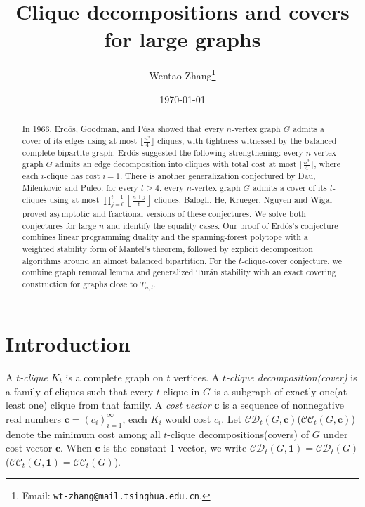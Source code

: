 \documentclass[11pt]{article}
\title{Clique decompositions and covers for large graphs}
\author{Wentao Zhang\thanks{Email: {\tt wt-zhang@mail.tsinghua.edu.cn}.}}
\affil{Yau Mathematical Sciences Center, Tsinghua University, Beijing, 100084, China}
\date{\today}
\numberwithin{equation}{section}
\theoremstyle{remark}
\newcommand{\CC}{\mathcal{CC}}
\newcommand{\CD}{\mathcal{CD}}
\begin{document}
\maketitle

\begin{abstract}
In 1966, Erd\H{o}s, Goodman, and P{\'o}sa showed that every \(n\)-vertex graph \(G\) admits a cover of its edges using at most \(\lfloor \frac{n^2}{4}\rfloor\) cliques, with tightness witnessed by the balanced complete bipartite graph.
Erd\H{o}s suggested the following strengthening: every \(n\)-vertex graph \(G\) admits an edge decomposition into cliques with total cost at most \(\lfloor \frac{n^2}{4}\rfloor\), where each \(i\)-clique has cost \(i-1\).
There is another generalization conjectured by Dau, Milenkovic and Puleo: for every \(t\ge4\), every \(n\)-vertex graph \(G\) admits a cover of its \(t\)-cliques using at most \(\prod_{j=0}^{t-1}\left\lfloor\frac{n+j}{t}\right\rfloor\) cliques.
Balogh, He, Krueger, Nguyen and Wigal proved asymptotic and fractional versions of these conjectures. We solve both conjectures for large \(n\) and identify the equality cases.
Our proof of Erd\H{o}s's conjecture combines linear programming duality and the spanning-forest polytope with a weighted stability form of Mantel's theorem, followed by explicit decomposition algorithms around an almost balanced bipartition.
For the \(t\)-clique-cover conjecture, we combine graph removal lemma and generalized Tur\'an stability with an exact covering construction for graphs close to \(T_{n,t}\).
\end{abstract}

\section{Introduction}

A \emph{\(t\)-clique} \(K_t\) is a complete graph on \(t\) vertices. A \emph{\(t\)-clique decomposition(cover)}
is a family of cliques such that every \(t\)-clique in \(G\) is a subgraph of exactly one(at least one) clique from that family.
A \emph{cost vector} \(\mathbf{c}\) is a sequence of nonnegative real numbers \(\mathbf{c}=\left(c_i\right)_{i=1}^\infty\),
each \(K_i\) would cost \(c_i\). Let \(\CD_t(G,\mathbf c)\)(\(\CC_t(G,\mathbf c)\)) denote the
minimum cost among all \(t\)-clique decompositions(covers) of \(G\) under cost vector \(\mathbf c\).
When \(\mathbf c\) is the constant \(1\) vector, we write \(\CD_t(G,\mathbf 1)=\CD_t(G)\)(\(\CC_t(G,\mathbf 1)=\CC_t(G)\)).
\end{document}
